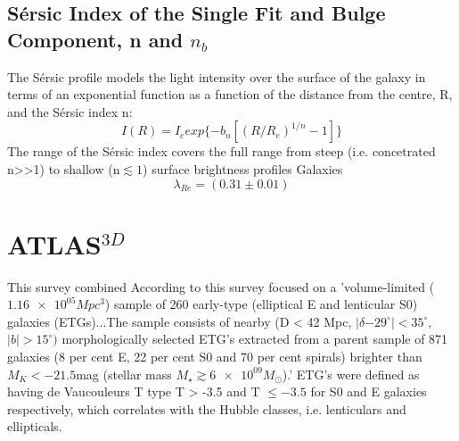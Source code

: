 \subsection{S\'ersic Index of the Single Fit and Bulge Component, n and $n_{b}$}
The S\'ersic profile models the light intensity over the surface of the galaxy in terms of an exponential function as a function of the distance from the centre, R, and the S\'ersic index n:
\begin{equation}
I(R) = I_{e} exp\{-b_{n} [(R/R_{e})^{1/n}-1]\}
\end{equation}
The range of the S\'ersic index covers the full range from steep (i.e. concetrated n>>1) to shallow (n$\lesssim 1$) surface brightness profiles %
Galaxies 
\begin{equation}
\lambda_{Re}=(0.31\pm0.01)
\end{equation}
\section{ATLAS$^{3D}$}
This survey combined 
According to \cite{Cappellari2011}
this survey focused on a 'volume-limited ($\num{1.16e05} Mpc^{3}$) sample of 260 early-type (elliptical E and lenticular S0) galaxies (ETGs)...The sample consists of nearby (D < 42 Mpc, $|\delta \num{-29}^{\circ}| < 35^{\circ}$, $|b| > 15^{\circ})$ morphologically selected ETG's extracted from a parent sample of 871 galaxies (8 per cent E, 22 per cent S0 and
70 per cent spirals) brighter than $M_{K} <\num{-21.5} $mag (stellar mass $M_{\star} \gtrsim \num{6e09} M_{\odot}$).' ETG's were defined as having de Vaucouleurs T type T > -3.5 and T $\leq -3.5$ for S0 and E galaxies respectively, which correlates with the Hubble classes, i.e. lenticulars and ellipticals.


